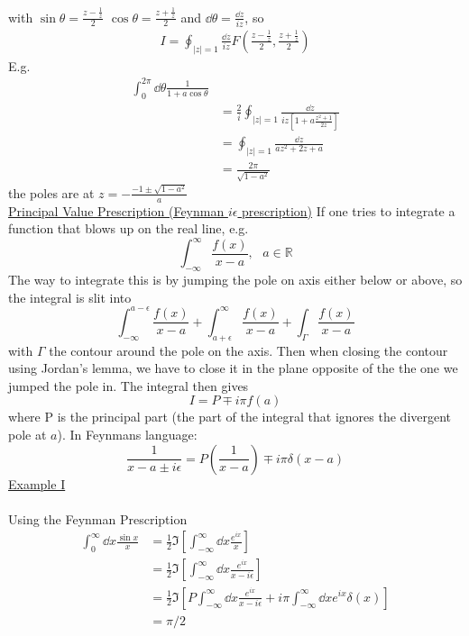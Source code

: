 \documentclass[a4paper,12pt]{article}
\begin{document}
with $\sin\theta = \frac{z-\frac{1}{z}}{2}$ $\cos\theta = \frac{z+\frac{1}{z}}{2}$ and $\dd \theta=\frac{\dd z}{iz}$, so
\begin{equation}
	\begin{aligned}
		I=\oint_{|z|=1} \frac{\dd z}{iz} F(\frac{z-\frac{1}{z}}{2}, \frac{z+\frac{1}{z}}{2} )
	\end{aligned}
\end{equation}
E.g.
\begin{equation}
	\begin{aligned}
		\int_{0}^{2\pi} \dd \theta \frac{1}{1+a\cos \theta}\\
		&=\frac{2}{i}\oint_{|z|=1} \frac{\dd z}{iz\left[1+a\frac{z^2+1}{2z}\right]}\\
		&=\oint_{|z|=1} \frac{\dd z}{az^2+2z+a}\\
		&=\frac{2\pi}{\sqrt{1-a^2}}
	\end{aligned}
\end{equation}
the poles are at $z=-\frac{-1\pm\sqrt{1-a^2}}{a}$\\
\underline{Principal Value Prescription (Feynman $i\epsilon$ prescription)}
If one tries to integrate a function that blows up on the real line, e.g.
\begin{equation}
\int_{-\infty}^{\infty}\frac{f(x)}{x-a}, ~~~ a\in \mathds{R}
\end{equation}
The way to integrate this is by jumping the pole on axis either below or above, so the integral is slit into
\begin{equation}
	\int_{-\infty}^{a-\epsilon}\frac{f(x)}{x-a}+\int_{a+\epsilon}^{\infty}\frac{f(x)}{x-a}+\int_\Gamma\frac{f(x)}{x-a}
\end{equation}
with $\Gamma$ the contour around the pole on the axis. Then when closing the contour using Jordan's lemma, we have to close it in the plane opposite of the the one we jumped the pole in.
The integral then gives
\begin{equation}
I = P\mp i \pi f(a)
\end{equation}
where P is the principal part (the part of the integral that ignores the divergent pole at $a$). In Feynmans language:
\begin{equation}
\frac{1}{x-a\pm i\epsilon}=P(\frac{1}{x-a})\mp i \pi\delta(x-a)
\end{equation}
\underline{Example I}\\\\
Using the Feynman Prescription
\begin{equation}
\begin{aligned}
 \int_{0}^{\infty} \dd x\frac{\sin x}{x} &=\frac{1}{2}\Im\left[ \int_{-\infty}^{\infty} \dd x\frac{e^{ix}}{x}\right]\\
 &=\frac{1}{2}\Im\left[ \int_{-\infty}^{\infty} \dd x\frac{e^{ix}}{x-i\epsilon}\right]\\
  &=\frac{1}{2}\Im\left[P \int_{-\infty}^{\infty} \dd x\frac{e^{ix}}{x-i\epsilon}+i\pi \int_{-\infty}^{\infty} \dd x e^{ix}\delta(x)\right]\\
  &=\pi/2
\end{aligned}
\end{equation}
\end{document}
